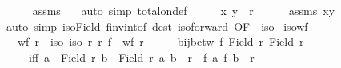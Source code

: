 \begin{isabellebody}
\ \ \ \ \isamarkupfalse%
\ assms\ {\isasymsection}\ \isamarkupfalse%
\ {\isacharparenleft}{\kern0pt}auto\ simp{\isacharcolon}{\kern0pt}\ total{\isacharunderscore}{\kern0pt}on{\isacharunderscore}{\kern0pt}def{\isacharparenright}{\kern0pt}\isanewline
\ \ \isamarkupfalse%
\ \isamarkupfalse%
\ {\isachardoublequoteopen}{\isacharparenleft}{\kern0pt}x{\isacharcomma}{\kern0pt}\ y{\isacharparenright}{\kern0pt}\ {\isasymin}\ r{\isacharprime}{\kern0pt}{\isachardoublequoteclose}\isanewline
\ \ \ \ \isamarkupfalse%
\ assms\ xy\ \isamarkupfalse%
\ {\isacharparenleft}{\kern0pt}auto\ simp{\isacharcolon}{\kern0pt}\ iso{\isacharunderscore}{\kern0pt}Field\ f{\isacharunderscore}{\kern0pt}inv{\isacharunderscore}{\kern0pt}into{\isacharunderscore}{\kern0pt}f\ dest{\isacharbang}{\kern0pt}{\isacharcolon}{\kern0pt}\ iso{\isacharunderscore}{\kern0pt}forward\ {\isacharbrackleft}{\kern0pt}OF\ {\isacharunderscore}{\kern0pt}\ iso{\isacharbrackright}{\kern0pt}{\isacharparenright}{\kern0pt}\isanewline
{}\isamarkupfalse%
%
\endisatagproof
{\isafoldproof}%
%
\isadelimproof
\isanewline
%
\endisadelimproof
\isanewline
{}\isamarkupfalse%
\ iso{\isacharunderscore}{\kern0pt}wf{\isacharcolon}{\kern0pt}\isanewline
\ \ \ {\isachardoublequoteopen}wf\ r{\isachardoublequoteclose}\ \ iso{\isacharcolon}{\kern0pt}\ {\isachardoublequoteopen}iso\ r\ r{\isacharprime}{\kern0pt}\ f{\isachardoublequoteclose}\ \ {\isachardoublequoteopen}wf\ r{\isacharprime}{\kern0pt}{\isachardoublequoteclose}\isanewline
%
\isadelimproof
%
\endisadelimproof
%
\isatagproof
{}\isamarkupfalse%
\ {\isacharminus}{\kern0pt}\isanewline
\ \ \isamarkupfalse%
\ {\isachardoublequoteopen}bij{\isacharunderscore}{\kern0pt}betw\ f\ {\isacharparenleft}{\kern0pt}Field\ r{\isacharparenright}{\kern0pt}\ {\isacharparenleft}{\kern0pt}Field\ r{\isacharprime}{\kern0pt}{\isacharparenright}{\kern0pt}{\isachardoublequoteclose}\isanewline
\ \ \ \ \ iff{\isacharcolon}{\kern0pt}\ {\isachardoublequoteopen}{\isacharparenleft}{\kern0pt}{\isasymforall}a\ {\isasymin}\ Field\ r{\isachardot}{\kern0pt}\ {\isasymforall}b\ {\isasymin}\ Field\ r{\isachardot}{\kern0pt}\ {\isacharparenleft}{\kern0pt}a{\isacharcomma}{\kern0pt}\ b{\isacharparenright}{\kern0pt}\ {\isasymin}\ r\ {\isasymlongleftrightarrow}\ {\isacharparenleft}{\kern0pt}f\ a{\isacharcomma}{\kern0pt}\ f\ b{\isacharparenright}{\kern0pt}\ {\isasymin}\ r{\isacharprime}{\kern0pt}{\isacharparenright}{\kern0pt}{\isachardoublequoteclose}\isanewline

\end{isabellebody}
